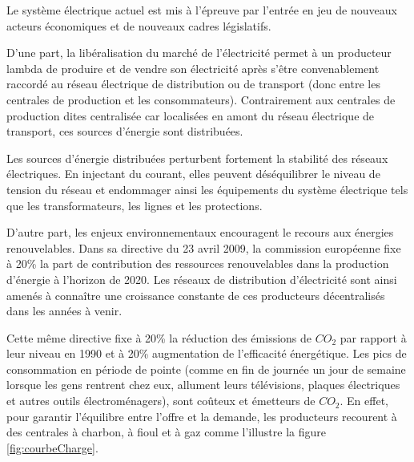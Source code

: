 Le système électrique actuel est mis à l'épreuve par l'entrée en jeu de nouveaux acteurs économiques et de nouveaux cadres législatifs. 


D'une part, la libéralisation du marché de l'électricité permet à un producteur lambda de produire et de vendre son électricité après s'être convenablement raccordé au réseau électrique de distribution ou de transport (donc entre les centrales de production et les consommateurs). Contrairement aux centrales de production dites centralisée car localisées en amont du réseau électrique de transport, ces sources d'énergie sont distribuées. 

Les sources d'énergie distribuées perturbent fortement la stabilité des réseaux électriques. En injectant du courant, elles peuvent déséquilibrer le niveau de tension du réseau et endommager ainsi les équipements du système électrique tels que les transformateurs, les lignes et les protections. 

D'autre part, les enjeux environnementaux encouragent le recours aux énergies renouvelables. Dans sa directive du 23 avril 2009, la commission européenne fixe à 20\% la part de contribution des ressources renouvelables dans la production d'énergie à l'horizon de 2020. Les réseaux de distribution d'électricité sont ainsi amenés à connaître une croissance constante de ces producteurs décentralisés dans les années à venir.

Cette même directive fixe à 20\% la réduction des émissions de $CO_{2}$ par rapport à leur niveau en 1990 et à 20\% augmentation de l'efficacité énergétique. Les pics de consommation en période de pointe (comme en fin de journée un jour de semaine lorsque les gens rentrent chez eux, allument leurs télévisions, plaques électriques et autres outils électroménagers), sont coûteux et émetteurs de $CO_{2}$. En effet, pour garantir l'équilibre entre l'offre et la demande, les producteurs recourent à des centrales à charbon, à fioul et à gaz comme l'illustre la figure \ref{fig:courbeCharge}.

